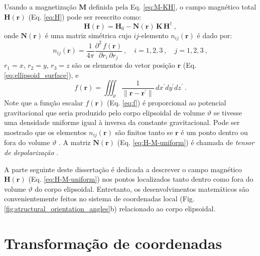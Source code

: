 Usando a magnetização $\mathbf{M}$ definida pela Eq. \ref{eq:M-KH}, o campo magnético total $\mathbf{H}(\mathbf{r})$ (Eq. \ref{eq:H}) pode ser reescrito como:
\begin{equation}
\mathbf{H}(\mathbf{r}) = \mathbf{H}_{0} 
- \mathbf{N}(\mathbf{r}) \, \mathbf{K} \, \mathbf{H}^{\dagger} \: ,
\label{eq:H-M-uniform}
\end{equation}
onde $\mathbf{N}(\mathbf{r})$ é uma matriz simétrica cujo
$ij$-elemento $n_{ij}(\mathbf{r})$ é dado por:
\begin{equation}
n_{ij}(\mathbf{r}) = 
\frac{1}{4\pi} \frac{\partial^{2} \, f(\mathbf{r})}
{\partial r_{i} \, \partial r_{j}} 
\: , \quad i = 1, 2, 3 \: , 
\quad j = 1, 2, 3 \: ,
\label{eq:nij}
\end{equation}
$r_{1} = x$, $r_{2} = y$, $r_{3} = z$ são os elementos do vetor posição $\mathbf{r}$ (Eq. \ref{eq:ellipsoid_surface}), 
e
\begin{equation}
f(\mathbf{r}) = \iiint_{\vartheta} 
\frac{1}{\| \mathbf{r} - \mathbf{r}^{\prime} \|}
\, dx^{\prime}dy^{\prime}dz^{\prime} \: .
\label{eq:f}
\end{equation}
Note que a função escalar $f(\mathbf{r})$ (Eq. \ref{eq:f}) é proporcional ao potencial gravitacional que seria produzido pelo corpo elipsoidal de volume $\vartheta$ se tivesse uma densidade uniforme igual à inversa da constante gravitacional. Pode ser mostrado que os elementos $n_{ij}(\mathbf{r})$ são finitos tanto se $\mathbf{r}$ é um ponto dentro ou fora do volume $\vartheta$ \citep{peirce1902, webster1904}. A matriz $\mathbf{N}(\mathbf{r})$ (Eq. \ref{eq:H-M-uniform}) é chamada de \textit{tensor de depolarização} \citep{soliverez1981, soliverez2008}.

A parte seguinte deste dissertação é dedicada a descrever o campo magnético $\mathbf{H}(\mathbf{r})$ (Eq. \ref{eq:H-M-uniform}) nos pontos localizados tanto dentro como fora do volume $\vartheta$ do corpo elipsoidal. Entretanto, os desenvolvimentos matemáticos são convenientemente feitos no sistema de coordenadas local (Fig. \ref{fig:structural_orientation_angles}b) relacionado ao corpo elipsoidal.

\section{Transformação de coordenadas}

